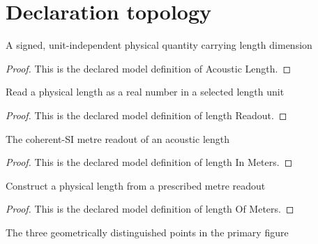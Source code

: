 \section{Declaration topology}
\begin{definition}
  \label{def:physics:phyx-mini-0323:phyxminiproblems-problemphyxmini0323-acousticlength}
  A signed, unit-independent physical quantity carrying length dimension
\end{definition}
\begin{proof}
  This is the declared model definition of Acoustic Length.
\end{proof}
\begin{definition}
  \label{def:physics:phyx-mini-0323:phyxminiproblems-problemphyxmini0323-lengthreadout}
  Read a physical length as a real number in a selected length unit
\end{definition}
\begin{proof}
  This is the declared model definition of length Readout.
\end{proof}
\begin{definition}
  \label{def:physics:phyx-mini-0323:phyxminiproblems-problemphyxmini0323-lengthinmeters}
  The coherent-SI metre readout of an acoustic length
\end{definition}
\begin{proof}
  This is the declared model definition of length In Meters.
\end{proof}
\begin{definition}
  \label{def:physics:phyx-mini-0323:phyxminiproblems-problemphyxmini0323-lengthofmeters}
  Construct a physical length from a prescribed metre readout
\end{definition}
\begin{proof}
  This is the declared model definition of length Of Meters.
\end{proof}
\begin{definition}
  \label{def:physics:phyx-mini-0323:phyxminiproblems-problemphyxmini0323-figurepoint}
  The three geometrically distinguished points in the primary figure
\end{definition}
